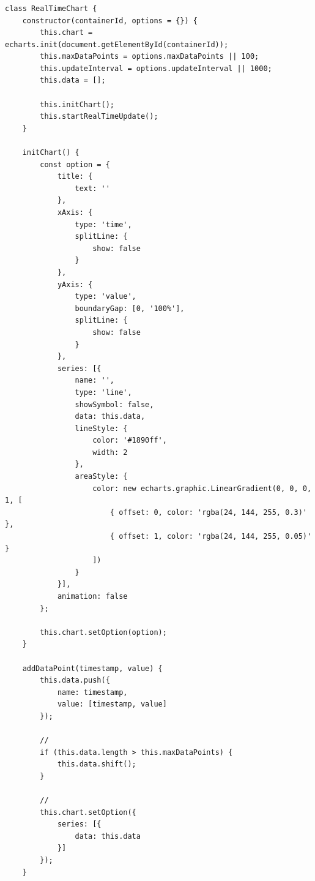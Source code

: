 \hypertarget{section-129}{%
\subsubsection{}\label{section-129}}

\hypertarget{section-130}{%
\paragraph{}\label{section-130}}

\begin{lstlisting}[style=javascript]
class RealTimeChart {
    constructor(containerId, options = {}) {
        this.chart = echarts.init(document.getElementById(containerId));
        this.maxDataPoints = options.maxDataPoints || 100;
        this.updateInterval = options.updateInterval || 1000;
        this.data = [];
        
        this.initChart();
        this.startRealTimeUpdate();
    }
    
    initChart() {
        const option = {
            title: {
                text: ''
            },
            xAxis: {
                type: 'time',
                splitLine: {
                    show: false
                }
            },
            yAxis: {
                type: 'value',
                boundaryGap: [0, '100%'],
                splitLine: {
                    show: false
                }
            },
            series: [{
                name: '',
                type: 'line',
                showSymbol: false,
                data: this.data,
                lineStyle: {
                    color: '#1890ff',
                    width: 2
                },
                areaStyle: {
                    color: new echarts.graphic.LinearGradient(0, 0, 0, 1, [
                        { offset: 0, color: 'rgba(24, 144, 255, 0.3)' },
                        { offset: 1, color: 'rgba(24, 144, 255, 0.05)' }
                    ])
                }
            }],
            animation: false
        };
        
        this.chart.setOption(option);
    }
    
    addDataPoint(timestamp, value) {
        this.data.push({
            name: timestamp,
            value: [timestamp, value]
        });
        
        // 
        if (this.data.length > this.maxDataPoints) {
            this.data.shift();
        }
        
        // 
        this.chart.setOption({
            series: [{
                data: this.data
            }]
        });
    }
    

\end{lstlisting}
